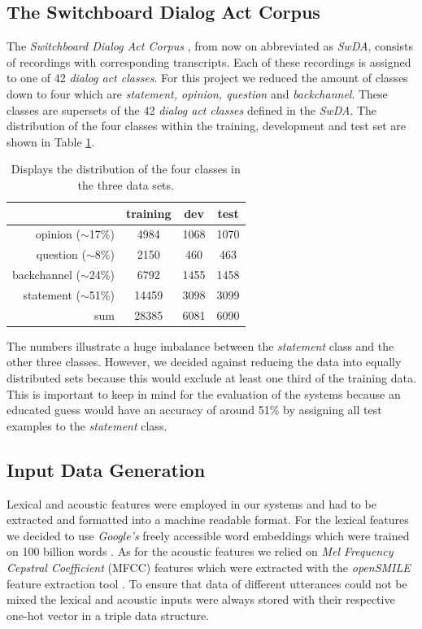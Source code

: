 \documentclass[11pt,a4paper]{article}
\begin{document}
	\subsection{The Switchboard Dialog Act Corpus}
	The \textit{Switchboard Dialog Act Corpus} \cite{switchboard}, from now on abbreviated as \textit{SwDA}, consists of recordings with corresponding transcripts. Each of these recordings is assigned to one of 42 \textit{dialog act classes}. For this project we reduced the amount of classes down to four which are \textit{statement, opinion, question} and \textit{backchannel}. These classes are supersets of the 42 \textit{dialog act classes} defined in the \textit{SwDA}. The distribution of the four classes within the training, development and test set are shown in Table \ref{tab:dataDistribution}.
	\begin{table}[]
		\centering
		\begin{tabular}{ r | c c c }
			& \textbf{training} & \textbf{dev} & \textbf{test} \\
			\hline
			opinion ($\sim$17\%) & 4984 & 1068 & 1070 \\
			question ($\sim$8\%) & 2150 & 460 & 463 \\
			backchannel ($\sim$24\%) & 6792 & 1455 & 1458  \\
			statement ($\sim$51\%) & 14459 & 3098 &  3099  \\
			\hline
			sum & 28385 & 6081 & 6090 \\
		\end{tabular}
		\caption{Displays the distribution of the four classes in the three data sets.}
		\label{tab:dataDistribution}
	\end{table}	
	The numbers illustrate a huge imbalance between the \textit{statement} class and the other three classes. However, we decided against reducing the data into equally distributed sets because this would exclude at least one third of the training data. This is important to keep in mind for the evaluation of the systems because an educated guess would have an accuracy of around 51\% by assigning all test examples to the \textit{statement} class.

	\subsection{Input Data Generation}
	Lexical and acoustic features were employed in our systems and had to be extracted and formatted into a machine readable format. For the lexical features we decided to use \textit{Google's} freely accessible word embeddings which were trained on 100 billion words \cite{word2vec}. As for the acoustic features we relied on \textit{Mel Frequency Cepstral Coefficient} (MFCC) features which were extracted with the \textit{openSMILE} feature extraction tool \cite{opensmile}. To ensure that data of different utterances could not be mixed the lexical and acoustic inputs were always stored with their respective one-hot vector in a triple data structure.
	
\end{document}
